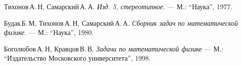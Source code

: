 \begin{thebibliography}{99}
Тихонов\,А.\,Н, Самарский\,А.\,А.
{\itshape Изд. 5, стереотипное.} --- М.: \enquote{Наука}, 1977.

Будак\,Б.\,М, Тихонов\,А.\,Н, Самарский\,А.\,А.
{\itshape Сборник задач по математической физике.} --- М.: \enquote{Наука}, 1980.

Боголюбов\,А.\,Н, Кравцов\,В.\,В.
{\itshape Задачи по математической физике} --- М.: \enquote{Издательство Московского университета}, 1998.


\end{thebibliography}
\pagebreak
